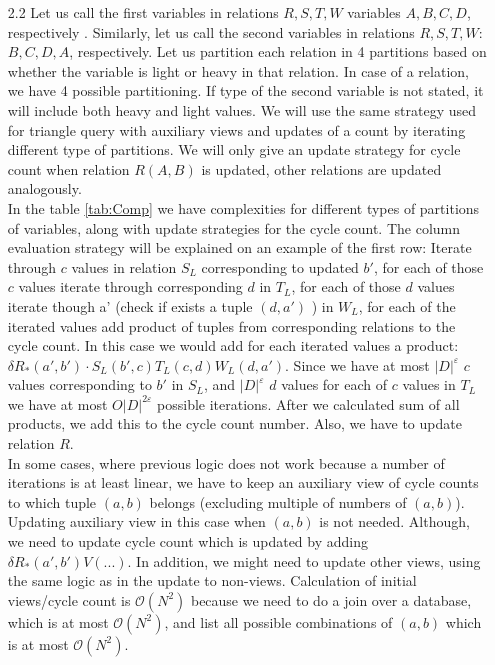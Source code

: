 \documentclass[10pt,a4paper]{article}
\begin{document}
\begin{enumerate}
\item[2.2]
Let us call the first variables in relations $R, S, T, W$ variables $A, B, C, D$, respectively . Similarly, let us call the second variables in relations $R, S, T, W$: $B, C, D, A$, respectively. 
Let us partition each relation in 4 partitions based on whether the variable is light or heavy in that relation. In case of a relation, we have 4 possible partitioning. If type of the second variable is not stated, it will include both heavy and light values. 
We will use the same strategy used for triangle query with auxiliary views and updates of a count by iterating different type of partitions. 
We will only give an update strategy for cycle count when relation $R(A, B)$ is updated, other relations are updated analogously. 
\\
In the table \ref{tab:Comp} we have complexities for different types of partitions of variables, along with update strategies for the cycle count. The column evaluation strategy will be explained on an example of the first row:
Iterate through $c$ values in relation $S_L$ corresponding to updated $b'$, for each of those $c$ values iterate through corresponding $d$ in $T_L$, for each of those $d$ values iterate though a' (check if exists a tuple $(d, a')$ ) in $W_L$, for each of the iterated values add product of tuples from corresponding relations to the cycle count. In this case we would add for each iterated values a product: $\delta R_*(a', b') \cdot S_L(b', c) T_L(c, d) W_L(d, a')$. Since we have at most $|D|^\varepsilon$ $c$ values corresponding to $b'$ in $S_L$, and $|D|^\varepsilon$ $d$ values for each of $c$ values in $T_L$ we have at most $O|D|^{2\varepsilon}$ possible iterations. After we calculated sum of all products, we add this to the cycle count number. Also, we have to update relation $R$. 
\\
In some cases, where previous logic does not work because a number of iterations is at least linear, we have to keep an auxiliary view of cycle counts to which tuple $(a, b)$ belongs (excluding multiple of numbers of $(a, b)$). Updating auxiliary view in this case when $(a, b)$ is not needed. Although, we need to update cycle count which is updated by adding $\delta R_*(a', b') V(...)$. In addition, we might need to update other views, using the same logic as in the update to non-views. Calculation of initial views/cycle count is $\mathcal{O}(N^2)$ because we need to do a join over a database, which is at most $\mathcal{O}(N^2)$, and list  all possible combinations of $(a,b)$ which is at most $\mathcal{O}(N^2)$. 

\end{enumerate}
\end{document}

